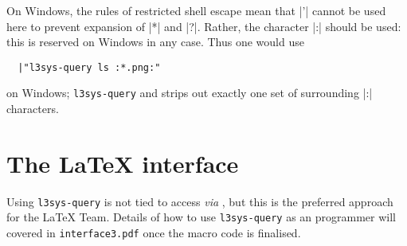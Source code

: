 \documentclass{l3doc}
\begin{document}
\begin{documentation}
On Windows, the rules of restricted shell escape mean that |'| cannot be
used here to prevent expansion of |*| and |?|. Rather, the character |:|
should be used: this is reserved on Windows in any case. Thus one would use
\begin{verbatim}
  |"l3sys-query ls :*.png:"
\end{verbatim}
on Windows; \texttt{l3sys-query} and strips out exactly one set of surrounding
|:| characters.

\section{The \LaTeX{} interface\label{sec:expl3}}

Using \texttt{l3sys-query} is not tied to access \emph{via} , but
this is the preferred approach for the \LaTeX{} Team. Details of how to use
\texttt{l3sys-query} as an  programmer will covered in
\texttt{interface3.pdf} once the macro code is finalised.

\end{documentation}

\PrintIndex
\end{document}

